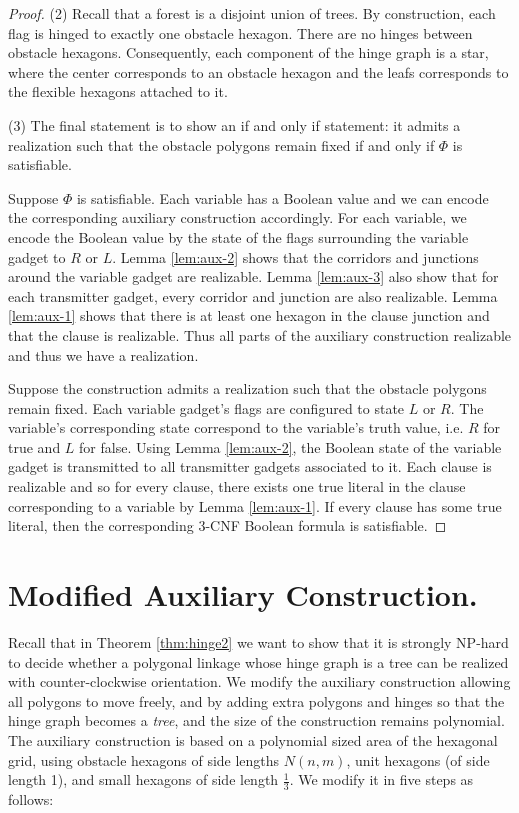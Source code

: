 \documentclass[10pt]{CSUNthesis}
\theoremstyle{plain}%
\theoremstyle{definition}
\theoremstyle{remark}
\begin{document}
\begin{proof}
\noindent (2) Recall that a forest is a disjoint union of trees. 
By construction, each flag is hinged to exactly one obstacle hexagon.  
There are no hinges between obstacle hexagons.
Consequently, each component of the hinge graph is a star, where the center corresponds to an obstacle hexagon and the leafs corresponds to the flexible hexagons attached to it.

\noindent (3) The final statement is to show an if and only if statement: it admits a realization such that the obstacle polygons remain fixed if and only if $\Phi$ is satisfiable.

Suppose $\Phi$ is satisfiable.  %
Each variable has a Boolean value and we can encode the corresponding auxiliary construction accordingly.  
For each variable, we encode the Boolean value by the state of the flags surrounding the variable gadget to $R$ or $L$.  
Lemma \ref{lem:aux-2} shows that the corridors and junctions around the variable gadget are realizable.
Lemma \ref{lem:aux-3} also show that for each transmitter gadget, every corridor and junction are also realizable. 
Lemma \ref{lem:aux-1} shows that there is at least one hexagon in the clause junction and that the clause is realizable.
Thus all parts of the auxiliary construction realizable and thus we have a realization.

Suppose the construction admits a realization such that the obstacle polygons remain fixed.
Each variable gadget's flags are configured to state $L$ or $R$. 
The variable's corresponding state correspond to the variable's truth value, i.e. $R$ for true and $L$ for false.
Using Lemma \ref{lem:aux-2}, the Boolean state of the variable gadget is transmitted to all transmitter gadgets associated to it.
Each clause is realizable and so for every clause, there exists one true literal in the clause corresponding to a variable by Lemma \ref{lem:aux-1}. 
If every clause has some true literal, then the corresponding 3-CNF Boolean formula is satisfiable.
\end{proof}
\section{Modified Auxiliary Construction.}

Recall that in Theorem \ref{thm:hinge2} we want to show that it is strongly NP-hard to decide whether a polygonal linkage whose hinge graph is a tree can be realized with counter-clockwise orientation.
We modify the auxiliary construction allowing all polygons to move freely, and by adding extra polygons and hinges so that the hinge graph becomes a \emph{tree}, and the size of the construction remains polynomial. 
The auxiliary construction is based on a polynomial sized area of the hexagonal grid, using obstacle hexagons of side lengths $N(n,m)$, unit hexagons (of side length 1), and small hexagons of side length $\frac{1}{3}$. 
We modify it in five steps as follows:
\end{document}
